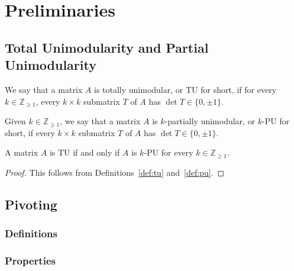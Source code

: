 \section{Preliminaries}

\subsection{Total Unimodularity and Partial Unimodularity}

\begin{definition}\label{def:tu}
    We say that a matrix $A$ is totally unimodular, or TU for short, if for every $k \in \mathbb{Z}_{\geq 1}$, every $k \times k$ submatrix $T$ of $A$ has $\det T \in \{0, \pm 1\}$.
\end{definition}

\begin{definition}\label{def:pu}
    Given $k \in \mathbb{Z}_{\geq 1}$, we say that a matrix $A$ is $k$-partially unimodular, or $k$-PU for short, if every $k \times k$ submatrix $T$ of $A$ has $\det T \in \{0, \pm 1\}$.
\end{definition}

\begin{lemma}\label{lem:tu_iff_all_pu}
    A matrix $A$ is TU if and only if $A$ is $k$-PU for every $k \in \mathbb{Z}_{\geq 1}$.
\end{lemma}

\begin{proof}
    This follows from Definitions~\ref{def:tu} and~\ref{def:pu}.
\end{proof}


\subsection{Pivoting}

\subsubsection{Definitions}


\subsubsection{Properties}

